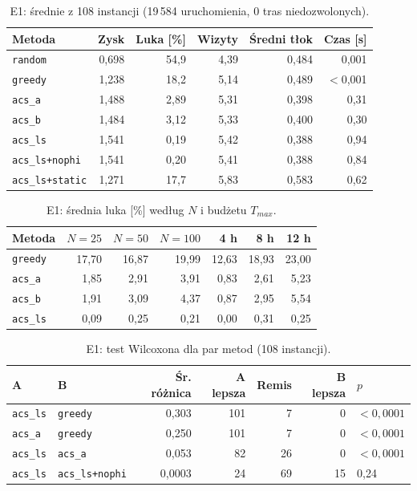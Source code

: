 \documentclass[11pt,a4paper]{article}
\begin{document}
\begin{table}[h]
\centering
\caption{E1: średnie z 108 instancji (19\,584 uruchomienia, 0 tras niedozwolonych).}
\begin{tabular}{lrrrrr}
\toprule
Metoda & Zysk & Luka [\%] & Wizyty & Średni tłok & Czas [s] \\
\midrule
\texttt{random} & 0,698 & 54,9 & 4,39 & 0,484 & 0,001 \\
\texttt{greedy} & 1,238 & 18,2 & 5,14 & 0,489 & $<$0,001 \\
\texttt{acs\_a} & 1,488 & 2,89 & 5,31 & 0,398 & 0,31 \\
\texttt{acs\_b} & 1,484 & 3,12 & 5,33 & 0,400 & 0,30 \\
\texttt{acs\_ls} & 1,541 & 0,19 & 5,42 & 0,388 & 0,94 \\
\texttt{acs\_ls+nophi} & 1,541 & 0,20 & 5,41 & 0,388 & 0,84 \\
\texttt{acs\_ls+static} & 1,271 & 17,7 & 5,83 & 0,583 & 0,62 \\
\bottomrule
\end{tabular}
\end{table}

\begin{table}[h]
\centering
\caption{E1: średnia luka [\%] według $N$ i budżetu $T_{max}$.}
\begin{tabular}{lrrrrrr}
\toprule
Metoda & $N=25$ & $N=50$ & $N=100$ & 4 h & 8 h & 12 h \\
\midrule
\texttt{greedy} & 17,70 & 16,87 & 19,99 & 12,63 & 18,93 & 23,00 \\
\texttt{acs\_a} & 1,85 & 2,91 & 3,91 & 0,83 & 2,61 & 5,23 \\
\texttt{acs\_b} & 1,91 & 3,09 & 4,37 & 0,87 & 2,95 & 5,54 \\
\texttt{acs\_ls} & 0,09 & 0,25 & 0,21 & 0,00 & 0,31 & 0,25 \\
\bottomrule
\end{tabular}
\end{table}

\begin{table}[h]
\centering
\caption{E1: test Wilcoxona dla par metod (108 instancji).}
\begin{tabular}{llrrrrl}
\toprule
A & B & Śr. różnica & A lepsza & Remis & B lepsza & $p$ \\
\midrule
\texttt{acs\_ls} & \texttt{greedy} & 0,303 & 101 & 7 & 0 & $<0{,}0001$ \\
\texttt{acs\_a} & \texttt{greedy} & 0,250 & 101 & 7 & 0 & $<0{,}0001$ \\
\texttt{acs\_ls} & \texttt{acs\_a} & 0,053 & 82 & 26 & 0 & $<0{,}0001$ \\
\texttt{acs\_ls} & \texttt{acs\_ls+nophi} & 0,0003 & 24 & 69 & 15 & 0,24 \\
\bottomrule
\end{tabular}
\end{table}
\end{document}

